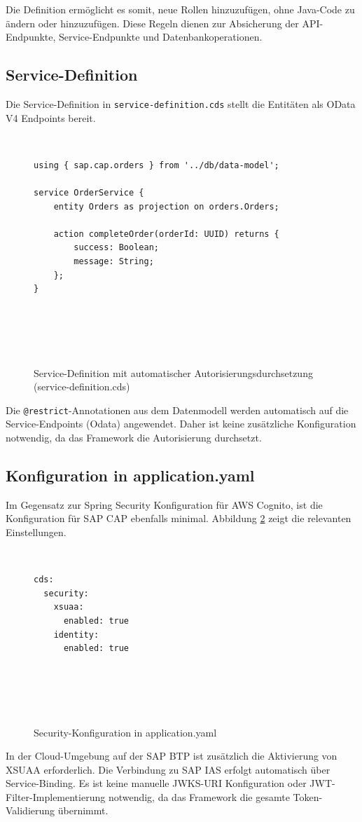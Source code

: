 Die Definition ermöglicht es somit, neue Rollen hinzuzufügen, ohne Java-Code zu ändern oder hinzuzufügen. Diese Regeln dienen zur Absicherung der API-Endpunkte, Service-Endpunkte und Datenbankoperationen.

\subsection{Service-Definition}

Die Service-Definition in \texttt{service-definition.cds} stellt die Entitäten als OData V4 Endpoints bereit.

\begin{figure}[h]
    \begin{verbatim}
using { sap.cap.orders } from '../db/data-model';

service OrderService {
    entity Orders as projection on orders.Orders;

    action completeOrder(orderId: UUID) returns {
        success: Boolean;
        message: String;
    };
}
    \end{verbatim}
    \caption{Service-Definition mit automatischer Autorisierungsdurchsetzung (service-definition.cds)}
    \label{fig:cds_service}
\end{figure}

Die \texttt{@restrict}-Annotationen aus dem Datenmodell werden automatisch auf die Service-Endpoints (Odata) angewendet. Daher ist keine zusätzliche Konfiguration notwendig, da das Framework die Autorisierung durchsetzt.

\subsection{Konfiguration in application.yaml}

Im Gegensatz zur Spring Security Konfiguration für \ac{AWS} Cognito, ist die Konfiguration für \ac{SAP CAP} ebenfalls minimal. Abbildung \ref{fig:cap_config} zeigt die relevanten Einstellungen.

\begin{figure}[h]
    \begin{verbatim}
cds:
  security:
    xsuaa:
      enabled: true
    identity:
      enabled: true
    \end{verbatim}
    \caption{Security-Konfiguration in application.yaml}
    \label{fig:cap_config}
\end{figure}

In der Cloud-Umgebung auf der \ac{SAP BTP} ist zusätzlich die Aktivierung von \ac{XSUAA} erforderlich. Die Verbindung zu \ac{SAP IAS} erfolgt automatisch über Service-Binding. Es ist keine manuelle \ac{JWKS}-\ac{URI} Konfiguration oder JWT-Filter-Implementierung notwendig, da das Framework die gesamte Token-Validierung übernimmt.

